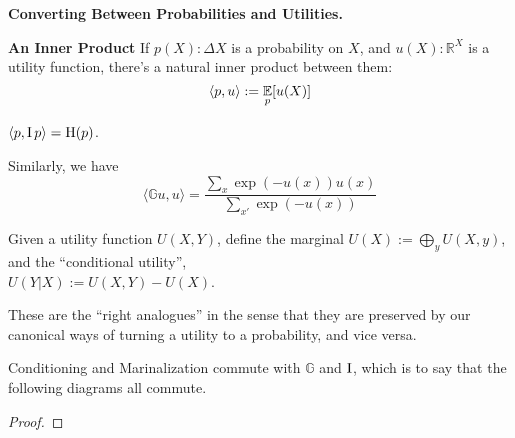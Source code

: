 \documentclass{article}
\newcommand\atleD{\scalerel*{\stackengine{-1pt}{%
  \rotatebox[origin=c]{30}{\rule{10pt}{.9pt}}\kern-1pt%
  \rotatebox[origin=c]{-30}{\rule{10pt}{1.3pt}}}{%
  \rule{.9pt}{10pt}}{O}{c}{F}{F}{S}}{\Delta}}
\newcommand{\Boltz}[1]{\mathbb G {#1}}
\begin{document}
    
    \textbf{Converting Between Probabilities and Utilities.}
    
    
    \textbf{An Inner Product}
    If $p(X) : \Delta X$ is a probability on $X$, and $u(X) : \mathbb R^{X}$ is a utility function, there's a natural inner product between them:
    \[ 
      \langle p, u \rangle := \operatorname*{\mathbb{E}}_p [u(X)] 
    \]
    
    \begin{prop}
      $\displaystyle\langle p,  \operatorname{\mathrm{I}} p \rangle = \operatorname{\mathrm{H}}(p)$.
    \end{prop}
    Similarly, we have
    \[
      \langle \Boltz u, u \rangle
        = \frac{\sum_x \exp(-u(x)) u(x) }{\sum_{x'} \exp (-u(x))}
    \]
    
    \begin{defn}      
    Given a utility function $U(X,Y)$, define the marginal $U(X) := \bigoplus_y U(X,y)$, 
    and the ``conditional utility'',\\
    $U(Y|X) := U(X,Y) - U(X)$.
    \end{defn}
    
    
    
    These are the ``right analogues'' in the sense that they are preserved by our canonical ways of turning a utility to a probability, and vice versa. 
    
    \begin{prop}
      Conditioning and Marinalization commute with  $\Boltz{}$ and $\operatorname{\mathrm{I}}$, which is to say that the following diagrams all commute. 
      
      \begin{center}
        \quad
      \end{center}
    \end{prop}
    \begin{proof}
       
    \end{proof}
    
\end{document}
